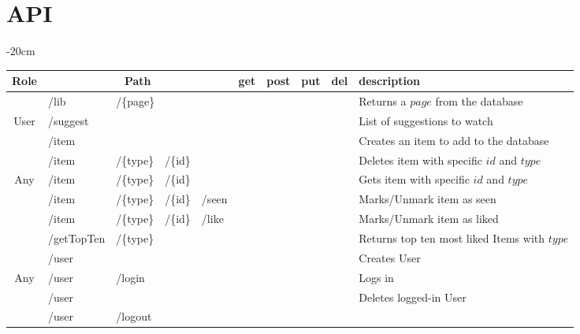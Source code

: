 \documentclass[oneside]{article}
\newcommand{\xmark}{\ding{53}} %
\begin{document}
\section{API}
\label{sec:api}
\begin{table}[H]
  \centering
  \addtolength{\leftskip} {-20cm}
  \addtolength{\rightskip}{-20cm}
  \begin{adjustbox}{width=1.4\textwidth}
  \begin{tabular}{ c|l l l l|c|c|c|c|l }
    \rowcolor{Gray}
    Role & \multicolumn{4}{c|}{Path} & get & post & put & del & description 
    \\ \hline
    & /lib & \multicolumn{3}{l|}{/\{page\}} &
    \xmark & & & &
    Returns a $page$ from the database
    \\
    \multirow{-2}{*}{User} & 
    \multicolumn{4}{l|}{/suggest} &
     & \xmark & & &
    List of suggestions to watch
    \\ \hhline{-|----|-|-|-|-|~} \rowcolor{Gray}
    & /item & & & &
    & \xmark & & &
    Creates an item to add to the database
    \\ \rowcolor{Gray}
    \multirow{-2}{*}{Admin} &
    /item & /\{type\} & /\{id\} & &
     & & & \xmark &
    Deletes item with specific $id$ and $type$ 
    \\ \hhline{-|----|-|-|-|-|~}
    Any &
    /item & /\{type\} & /\{id\} & &
    \xmark & & & &
    Gets item with specific $id$ and $type$ 
    \\ \hhline{-|----|-|-|-|-|~} \rowcolor{Gray}
    & /item & /\{type\} & /\{id\} & /seen &
    & & \xmark & \xmark &
    Marks/Unmark item as seen
    \\ \rowcolor{Gray}
    \multirow{-2}{*}{User}
    & /item & /\{type\} & /\{id\} & /like &
    & & \xmark & \xmark &
    Marks/Unmark item as liked
    \\ \hhline{-|----|-|-|-|-|~}
    & /getTopTen & /\{type\} &  &  &
    \xmark & & & &
    Returns top ten most liked Items with $type$
    \\ 
    & \multicolumn{4}{l|}{/user} &
    & \xmark & & &
    Creates User
    \\
    \multirow{-3}{*}{Any} 
    & /user & \multicolumn{3}{l|}{/login} &
    \xmark & & & &
    Logs in
    \\ \hhline{-|----|-|-|-|-|~} \rowcolor{Gray}
    & \multicolumn{4}{l|}{/user} &
     & & & \xmark &
    Deletes logged-in User
    \\ \rowcolor{Gray}
    \multirow{-2}{*}{User} 
    & /user & \multicolumn{3}{l|}{/logout} &
    \xmark & & & &

\end{tabular}
\end{adjustbox}
\end{table}
\end{document}
